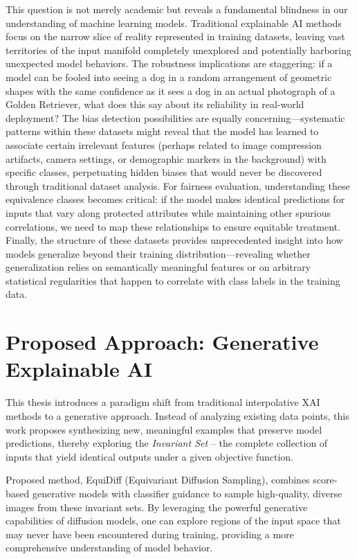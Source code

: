 \documentclass[licencjacka,en]{pracamgr}
\newcommand{\method}[1]{EquiDiff}  %
\begin{document}
This question is not merely academic but reveals a fundamental blindness in our understanding of machine learning models. Traditional explainable AI methods focus on the narrow slice of reality represented in training datasets, leaving vast territories of the input manifold completely unexplored and potentially harboring unexpected model behaviors. The robustness implications are staggering: if a model can be fooled into seeing a dog in a random arrangement of geometric shapes with the same confidence as it sees a dog in an actual photograph of a Golden Retriever, what does this say about its reliability in real-world deployment? The bias detection possibilities are equally concerning—systematic patterns within these datasets might reveal that the model has learned to associate certain irrelevant features (perhaps related to image compression artifacts, camera settings, or demographic markers in the background) with specific classes, perpetuating hidden biases that would never be discovered through traditional dataset analysis. For fairness evaluation, understanding these equivalence classes becomes critical: if the model makes identical predictions for inputs that vary along protected attributes while maintaining other spurious correlations, we need to map these relationships to ensure equitable treatment. Finally, the structure of these datasets provides unprecedented insight into how models generalize beyond their training distribution—revealing whether generalization relies on semantically meaningful features or on arbitrary statistical regularities that happen to correlate with class labels in the training data.

\section{Proposed Approach: Generative Explainable AI}

This thesis introduces a paradigm shift from traditional interpolative XAI methods to a generative approach. Instead of analyzing existing data points, this work proposes synthesizing new, meaningful examples that preserve model predictions, thereby exploring the \textit{Invariant Set} -- the complete collection of inputs that yield identical outputs under a given objective function.

Proposed method, \method{} (Equivariant Diffusion Sampling), combines score-based generative models with classifier guidance to sample high-quality, diverse images from these invariant sets. By leveraging the powerful generative capabilities of diffusion models, one can explore regions of the input space that may never have been encountered during training, providing a more comprehensive understanding of model behavior.
\end{document}

